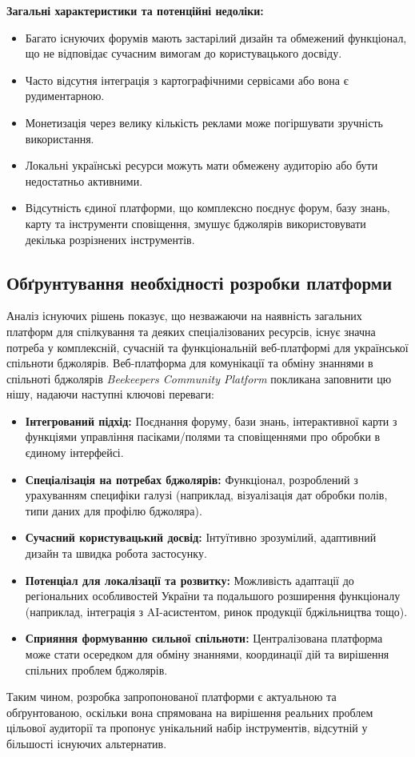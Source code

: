 \textbf{Загальні характеристики та потенційні недоліки:}
\begin{itemize}
    \item Багато існуючих форумів мають застарілий дизайн та обмежений функціонал, що не відповідає сучасним вимогам до користувацького досвіду.
    \item Часто відсутня інтеграція з картографічними сервісами або вона є рудиментарною.
    \item Монетизація через велику кількість реклами може погіршувати зручність використання.
    \item Локальні українські ресурси можуть мати обмежену аудиторію або бути недостатньо активними.
    \item Відсутність єдиної платформи, що комплексно поєднує форум, базу знань, карту та інструменти сповіщення, змушує бджолярів використовувати декілька розрізнених інструментів.
\end{itemize}

\subsection{Обґрунтування необхідності розробки платформи}
Аналіз існуючих рішень показує, що незважаючи на наявність загальних платформ для спілкування та деяких спеціалізованих ресурсів, існує значна потреба у комплексній, сучасній та функціональній веб-платформі для української спільноти бджолярів. Веб-платформа для комунікації та обміну знаннями в спільноті бджолярів \textit{Beekeepers Community Platform} покликана заповнити цю нішу, надаючи наступні ключові переваги:
\begin{itemize}
    \item \textbf{Інтегрований підхід:} Поєднання форуму, бази знань, інтерактивної карти з функціями управління пасіками/полями та сповіщеннями про обробки в єдиному інтерфейсі.
    \item \textbf{Спеціалізація на потребах бджолярів:} Функціонал, розроблений з урахуванням специфіки галузі (наприклад, візуалізація дат обробки полів, типи даних для профілю бджоляра).
    \item \textbf{Сучасний користувацький досвід:} Інтуїтивно зрозумілий, адаптивний дизайн та швидка робота застосунку.
    \item \textbf{Потенціал для локалізації та розвитку:} Можливість адаптації до регіональних особливостей України та подальшого розширення функціоналу (наприклад, інтеграція з AI-асистентом, ринок продукції бджільництва тощо).
    \item \textbf{Сприяння формуванню сильної спільноти:} Централізована платформа може стати осередком для обміну знаннями, координації дій та вирішення спільних проблем бджолярів.
\end{itemize}
Таким чином, розробка запропонованої платформи є актуальною та обґрунтованою, оскільки вона спрямована на вирішення реальних проблем цільової аудиторії та пропонує унікальний набір інструментів, відсутній у більшості існуючих альтернатив.

